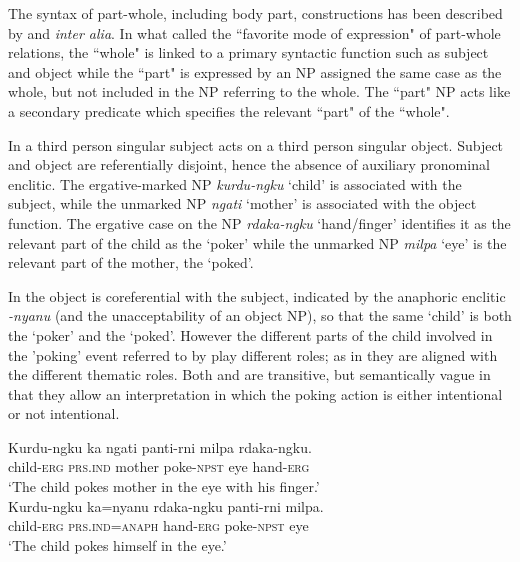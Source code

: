 \documentclass[output=paper]{../langscibook}
\begin{document}
The syntax of part-whole, including body part, constructions has been described by \citet{Hale1981} and \citet{Laughren1992} \textit{inter alia}. In what \citet[338]{Hale1981} called the ``favorite mode of expression" of part-whole relations, the ``whole" is linked to a primary syntactic function such as subject and object while the ``part" is expressed by an NP assigned the same case as the whole, but not included in the NP referring to the whole. The ``part" NP acts like a secondary predicate which specifies the relevant ``part" of the ``whole".

In  a third person singular subject acts on a third person singular object. Subject and object are referentially disjoint, hence the absence of auxiliary pronominal enclitic. The ergative-marked NP \textit{kurdu-ngku} `child' is associated with the subject, while the unmarked NP \textit{ngati} `mother' is associated with the object function. The ergative case on the NP \textit{rdaka-ngku} `hand/finger' identifies it as the relevant part of the child as the `poker' while the unmarked NP \textit{milpa} `eye' is the relevant part of the mother, the `poked'.

In  the object is coreferential with the subject, indicated by the anaphoric enclitic \textit{{}-nyanu} (and the unacceptability of an object NP), so that the same `child' is both the `poker' and the `poked'. However the different parts of the child involved in the 'poking' event referred to by  play different roles; as in  they are aligned with the different thematic roles. Both  and  are transitive, but semantically vague in that they allow an interpretation in which the poking action is either intentional or not intentional.

\ea%
\label{ex:laughren:18}
\ea
\label{ex:laughren:18a}
\gll Kurdu-ngku	ka	ngati	panti-rni	milpa	rdaka-ngku.\\
child-\textsc{erg}	\textsc{prs.ind} mother	poke-\textsc{npst}	eye	hand-\textsc{erg}\\
\glt `The child pokes mother in the eye with his finger.' \\

\ex
\label{ex:laughren:18b}
\gll Kurdu-ngku	ka=nyanu rdaka-ngku	panti-rni	milpa.\\
child-\textsc{erg}	\textsc{prs.ind=anaph}	hand-\textsc{erg}	poke-\textsc{npst}	eye	\\
\glt `The child pokes himself in the eye.'\\
\z
\z 
\end{document}

